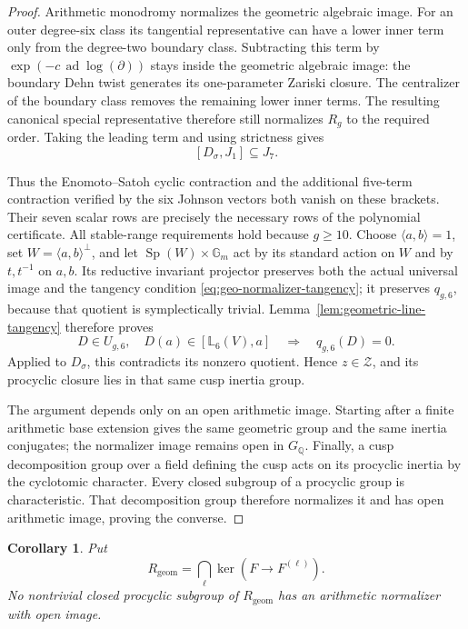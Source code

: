 \documentclass[11pt]{article}
\newtheorem{corollary}[theorem]{Corollary}
\theoremstyle{definition}\newtheorem{definition}[theorem]{Definition}
\begin{document}
\begin{proof}
Arithmetic monodromy normalizes the geometric algebraic image.
For an outer degree-six class its tangential representative
can have a lower inner term only from the degree-two
boundary class.  Subtracting this term by
\(\exp(-c\,\operatorname{ad}\log(\partial))\) stays inside
the geometric algebraic image: the boundary Dehn twist
generates its one-parameter Zariski closure.
The centralizer of the boundary class removes the
remaining lower inner terms.
The resulting canonical special representative therefore
still normalizes \(R_g\) to the required order.
Taking the leading term and using strictness gives
\[
                         [D_\sigma,J_1]\subseteq J_7.
\]

Thus the Enomoto--Satoh cyclic contraction and the additional
five-term contraction verified by the six Johnson vectors
both vanish on these brackets.  Their seven scalar rows
are precisely the necessary rows of the polynomial certificate.
All stable-range requirements hold because \(g\geq10\).
Choose \(\langle a,b\rangle=1\), set
\(W=\langle a,b\rangle^\perp\), and let
\(\operatorname{Sp}(W)\times\mathbb G_m\) act by its standard
action on \(W\) and by \(t,t^{-1}\) on \(a,b\).
Its reductive invariant projector preserves both the actual universal
image and the tangency condition
\eqref{eq:geo-normalizer-tangency}; it preserves \(q_{g,6}\),
because that quotient is symplectically trivial.
Lemma~\ref{lem:geometric-line-tangency} therefore proves
\[
 D\in U_{g,6},\quad D(a)\in[\mathbb L_6(V),a]
                       \quad\Longrightarrow\quad q_{g,6}(D)=0.
\]
Applied to \(D_\sigma\), this contradicts its nonzero quotient.
Hence \(z\in\mathcal Z\), and its procyclic closure lies
in that same cusp inertia group.

The argument depends only on an open arithmetic image.
Starting after a finite arithmetic base extension gives
the same geometric group and the same inertia conjugates;
the normalizer image remains open in \(G_{\mathbb Q}\).
Finally, a cusp decomposition group over a field defining
the cusp acts on its procyclic inertia by the cyclotomic
character.  Every closed subgroup of a procyclic group
is characteristic.  That decomposition group therefore
normalizes it and has open arithmetic image, proving
the converse.
\end{proof}

\begin{corollary}\label{cor:geometric-common-kernel-recognition}
Put
\[
 R_{\mathrm{geom}}=
 \bigcap_\ell\ker\!\left(F\longrightarrow F^{(\ell)}\right).
\]
No nontrivial closed procyclic subgroup of \(R_{\mathrm{geom}}\)
has an arithmetic normalizer with open image.
\end{corollary}
\end{document}

